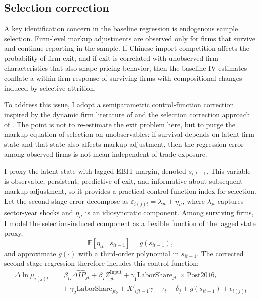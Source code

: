 \documentclass[12pt]{article}
\begin{document}
\subsection{Selection correction}

A key identification concern in the baseline regression is endogenous sample selection. Firm-level markup adjustments are observed only for firms that survive and continue reporting in the sample. If Chinese import competition affects the probability of firm exit, and if exit is correlated with unobserved firm characteristics that also shape pricing behavior, then the baseline IV estimates conflate a within-firm response of surviving firms with compositional changes induced by selective attrition. 

To address this issue, I adopt a semiparametric control-function correction inspired by the dynamic firm literature of \textcite{ericsonMarkovPerfectIndustryDynamics1995} and the selection correction approach of \textcite{backusWhyProductivityCorrelated2020}. The point is not to re-estimate the exit problem here, but to purge the markup equation of selection on unobservables: if survival depends on latent firm state and that state also affects markup adjustment, then the regression error among observed firms is not mean-independent of trade exposure.

I proxy the latent state with lagged EBIT margin, denoted $s_{i,t-1}$. This variable is observable, persistent, predictive of exit, and informative about subsequent markup adjustment, so it provides a practical control-function index for selection. Let the second-stage error decompose as $\varepsilon_{i(j)t} = \lambda_{jt} + \eta_{it}$, where $\lambda_{jt}$ captures sector-year shocks and $\eta_{it}$ is an idiosyncratic component. Among surviving firms, I model the selection-induced component as a flexible function of the lagged state proxy,
\[
\mathbb{E}[\eta_{it} \mid s_{it-1}] = g(s_{it-1}),
\]
and approximate $g(\cdot)$ with a third-order polynomial in $s_{it-1}$. The corrected second-stage regression therefore includes this control function:
\begin{equation}
\begin{aligned}
\Delta \ln \mu_{i(j)t} &= \beta_O \widehat{\Delta IP_{jt}} + \beta_I Z_{jt}^{\text{Input}} + \gamma_1 \text{LaborShare}_{jt_0} \times \text{Post2016}_t \\
&\quad + \gamma_2 \text{LaborShare}_{jt_0} + X'_{ijt-1} \gamma + \tau_t + \delta_j + g(s_{it-1}) + \epsilon_{i(j)t}
\end{aligned}
\end{equation}
\end{document}
